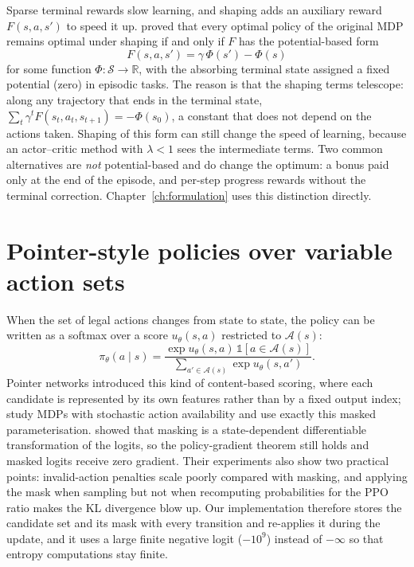 Sparse terminal rewards slow learning, and shaping adds an auxiliary reward $F(s,a,s')$ to speed it up. \citet{ng1999policy} proved that every optimal policy of the original MDP remains optimal under shaping if and only if $F$ has the potential-based form
\begin{equation}
  F(s,a,s')=\gamma\,\Phi(s')-\Phi(s)
  \label{eq:shaping}
\end{equation}
for some function $\Phi:\mathcal{S}\to\mathbb{R}$, with the absorbing terminal state assigned a fixed potential (zero) in episodic tasks. The reason is that the shaping terms telescope: along any trajectory that ends in the terminal state, $\sum_t\gamma^tF(s_t,a_t,s_{t+1})=-\Phi(s_0)$, a constant that does not depend on the actions taken. Shaping of this form can still change the speed of learning, because an actor--critic method with $\lambda<1$ sees the intermediate terms. Two common alternatives are \emph{not} potential-based and do change the optimum: a bonus paid only at the end of the episode, and per-step progress rewards without the terminal correction. Chapter~\ref{ch:formulation} uses this distinction directly.

\section{Pointer-style policies over variable action sets}

When the set of legal actions changes from state to state, the policy can be written as a softmax over a score $u_\theta(s,a)$ restricted to $\mathcal{A}(s)$:
\begin{equation}
  \pi_\theta(a\mid s)=\frac{\exp u_\theta(s,a)\,\mathbb{1}[a\in\mathcal{A}(s)]}{\sum_{a'\in\mathcal{A}(s)}\exp u_\theta(s,a')}.
  \label{eq:maskedsoftmax}
\end{equation}
Pointer networks \citep{vinyals2015pointer} introduced this kind of content-based scoring, where each candidate is represented by its own features rather than by a fixed output index; \citet{chandak2020sas} study MDPs with stochastic action availability and use exactly this masked parameterisation. \citet{huang2022closer} showed that masking is a state-dependent differentiable transformation of the logits, so the policy-gradient theorem still holds and masked logits receive zero gradient. Their experiments also show two practical points: invalid-action penalties scale poorly compared with masking, and applying the mask when sampling but not when recomputing probabilities for the PPO ratio makes the KL divergence blow up. Our implementation therefore stores the candidate set and its mask with every transition and re-applies it during the update, and it uses a large finite negative logit ($-10^9$) instead of $-\infty$ so that entropy computations stay finite.

